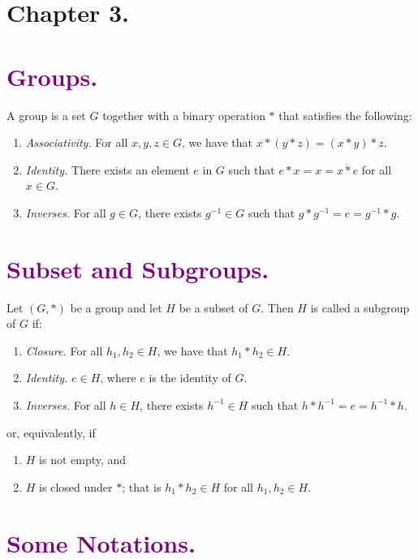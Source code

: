 \documentclass[9pt]{article}
\begin{document}
   \section*{Chapter 3.}

   \section*{\textcolor{purple}{Groups.}} A group is a set $G$ together with a
   binary operation $*$ that satisfies the following:
   \begin{enumerate}
      \item \textit{Associativity.} For all $x, y, z \in G$, we have that
            $x * (y * z) = (x * y) * z$.
      \item \textit{Identity.} There exists an element $e$ in $G$ such that
            $e * x = x = x * e$ for all $x \in G$.
      \item \textit{Inverses.} For all $g \in G$, there exists $g^{-1} \in G$
            such that $g * g^{-1} = e = g^{-1} * g$.
   \end{enumerate}

   \section*{\textcolor{purple}{Subset and Subgroups.}} Let $(G, *)$ be a
   group and let $H$ be a subset of $G$. Then $H$ is called a subgroup of $G$
   if:
   \begin{enumerate}
      \item \textit{Closure.} For all $h_1, h_2 \in H$, we have that
            $h_1 * h_2 \in H$.
      \item \textit{Identity.} $e \in H$, where $e$ is the identity of $G$.
      \item \textit{Inverses.} For all $h \in H$, there exists $h^{-1} \in H$
            such that $h * h^{-1} = e = h^{-1} * h$.
   \end{enumerate}

   or, equivalently, if
   \begin{enumerate}
      \item $H$ is not empty, and
      \item $H$ is closed under $*$; that is $h_1 * h_2 \in H$ for 
            all $h_1, h_2 \in H$.
   \end{enumerate}

   \section*{\textcolor{purple}{Some Notations.}}
\end{document}
